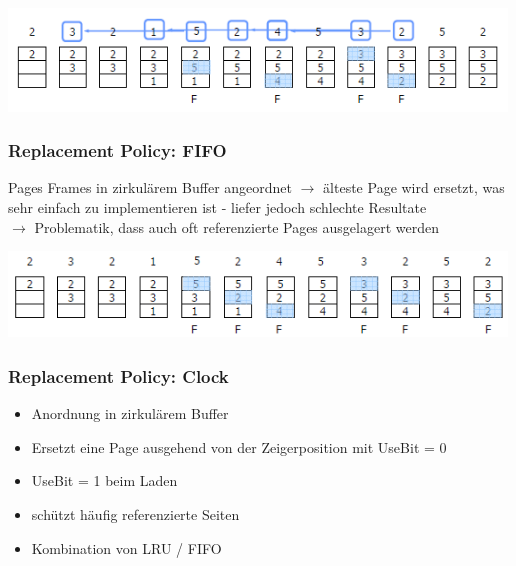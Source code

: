 \documentclass{report}
\newenvironment{Figure}
	{\par\medskip\noindent\minipage{\linewidth}}
	{\endminipage\par\medskip}
\theoremstyle{definition}
\theoremstyle{example}
\begin{document}
\begin{Figure}
\centering
\includegraphics[width=500px]{img/ReplacementPolicyLRU.png}
	\label{fig:Abbildung der ReplacementPolicy: least recently used}
\end{Figure}

		\subsubsection{Replacement Policy: FIFO}
Pages Frames in zirkulärem Buffer angeordnet $\rightarrow$ älteste Page wird ersetzt, was sehr einfach zu implementieren ist - liefer jedoch schlechte Resultate\\
$\rightarrow$ Problematik, dass auch oft referenzierte Pages ausgelagert werden

\begin{Figure}
\centering
\includegraphics[width=500px]{img/ReplacementPolicyFIFO.png}
	\label{fig:Abbildung der ReplacementPolicy: FIFO}
\end{Figure}


		\subsubsection{Replacement Policy: Clock}
\begin{itemize}
	\item Anordnung in zirkulärem Buffer
	\item Ersetzt eine Page ausgehend von der Zeigerposition mit UseBit = 0 
	\item UseBit = 1 beim Laden
	\item schützt häufig referenzierte Seiten
	\item Kombination von LRU / FIFO
\end{itemize}
\end{document}
